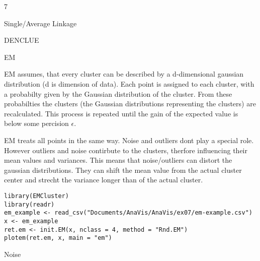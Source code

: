 \documentclass{article}
\begin{document}
    \begin{ukon-infie}[12.12.17]{7}

        \begin{exercise}[p=7]{Single/Average Linkage}      

		\end{exercise}
		
		\begin{exercise}[p=2]{DENCLUE}

		\end{exercise}
		
		\begin{exercise}[p=7]{EM}
		
		\question{}
		{
			EM assumes, that every cluster can be described by a d-dimensional gaussian distribution (d is dimension of data). Each point is assigned to each cluster, with a probabilty given by the Gaussian distribution of the cluster. From these probabilties the clusters (the Gaussian distributions representing the clusters) are recalculated. This process is repeated until the gain of the expected value is below some percision $\epsilon$.
		}
		
		\question{}
		{
			EM treats all points in the same way. Noise and outliers dont play a special role.\\
			However outliers and noise contirbute to the clusters, therfore influencing their mean values and variances. This means that noise/outliers can distort the gaussian distributions. They can shift the mean value from the actual cluster center and strecht the variance longer than of the actual cluster.
		}
		\question{}
		{}
\begin{verbatim}
library(EMCluster)
library(readr)
em_example <- read_csv("Documents/AnaVis/AnaVis/ex07/em-example.csv")
x <- em_example
ret.em <- init.EM(x, nclass = 4, method = "Rnd.EM")
plotem(ret.em, x, main = "em")
\end{verbatim}
		
		
		
	
		\end{exercise}
		
		\begin{exercise}[p=3]{Noise}
		

\end{exercise}
\end{ukon-infie}
\end{document}
